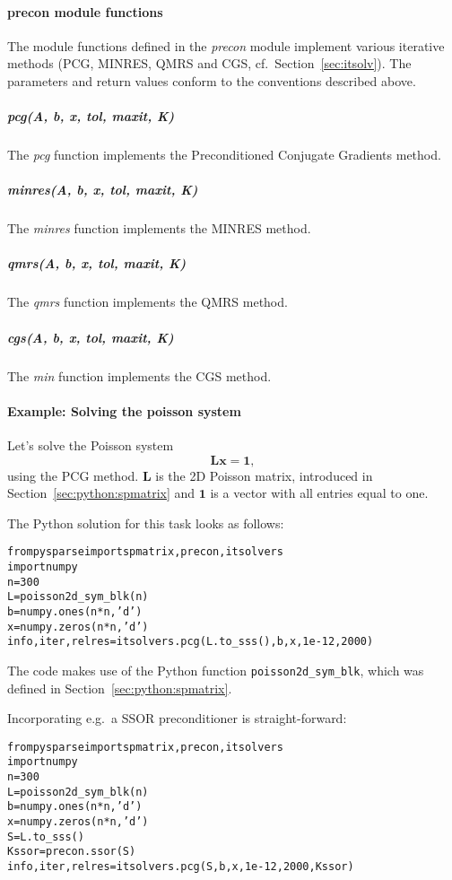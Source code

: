 \documentclass[a4paper]{article}
\newcommand{\mat}[1]{\ensuremath{\boldsymbol{#1}}}
\newcommand{\vect}[1]{\ensuremath{\mathbf{#1}}}
\newlength{\pyindent} \newlength{\pyminipagewidth}
\newenvironment{pycode}{\begin{trivlist}\item\hspace*{\pyindent}\begin{minipage}{\pyminipagewidth}\small\begin{alltt}}
      {\end{alltt}\end{minipage}\end{trivlist}}
\begin{document}
\paragraph{precon module functions}
%
The module functions defined in the \textit{precon} module implement
various iterative methods (PCG, MINRES, QMRS and CGS, cf.\ 
Section~\ref{sec:itsolv}). The parameters and return values conform to
the conventions described above.

\subparagraph{pcg(A, b, x, tol, maxit, K)}
%
The \textit{pcg} function implements the Preconditioned Conjugate
Gradients method.

\subparagraph{minres(A, b, x, tol, maxit, K)}
%
The \textit{minres} function implements the MINRES method.

\subparagraph{qmrs(A, b, x, tol, maxit, K)}
%
The \textit{qmrs} function implements the QMRS method.

\subparagraph{cgs(A, b, x, tol, maxit, K)} The \textit{min} function
implements the CGS method.
%

\paragraph{Example: Solving the poisson system}
%
Let's solve the Poisson system
\begin{equation}
  \label{eq:python:1}
  \mat{L} \vect{x} = \vect{1},
\end{equation}
using the PCG method. $\mat{L}$ is the 2D Poisson matrix, introduced
in Section~\ref{sec:python:spmatrix} and $\vect{1}$ is a vector with
all entries equal to one.

\noindent The Python solution for this task looks as follows:
\begin{pycode}
from pysparse import spmatrix, precon, itsolvers
import numpy
n = 300
L = poisson2d_sym_blk(n)
b = numpy.ones(n*n, 'd')
x = numpy.zeros(n*n, 'd')
info, iter, relres = itsolvers.pcg(L.to_sss(), b, x, 1e-12, 2000)
\end{pycode}
The code makes use of the Python function \texttt{poisson2d\_sym\_blk},
which was defined in Section~\ref{sec:python:spmatrix}.

\noindent Incorporating e.g.\ a SSOR preconditioner is straight-forward:
\begin{pycode}
from pysparse import spmatrix, precon, itsolvers
import numpy
n = 300
L = poisson2d_sym_blk(n)
b = numpy.ones(n*n, 'd')
x = numpy.zeros(n*n, 'd')
S = L.to_sss()
Kssor = precon.ssor(S)
info, iter, relres = itsolvers.pcg(S, b, x, 1e-12, 2000, Kssor)
\end{pycode}
\end{document}
